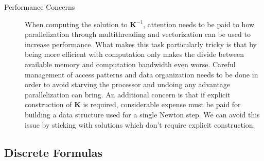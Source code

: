 \begin{description}
  \item[Performance Concerns] When computing the solution to
    $\mathbf K^{-1}$, attention needs to be paid to how
    parallelization through multithreading and vectorization can be
    used to increase performance. What makes this task particularly
    tricky is that by being more efficient with computation only makes
    the divide between available memory and computation bandwidth even
    worse. Careful management of access patterns and data organization
    needs to be done in order to avoid starving the processor and
    undoing any advantage parallelization can bring. An additional
    concern is that if explicit construction of $\bm K$ is required,
    considerable expense must be paid for building a data structure
    used for a single Newton step. We can avoid this issue by sticking
    with solutions which don't require explicit construction.
 
\end{description}


\subsection{Discrete Formulas}
\label{sec:engineering:discreteformulas}

